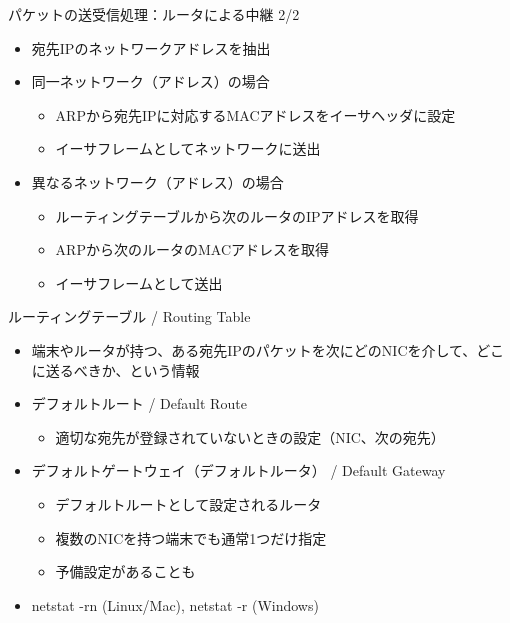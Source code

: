 \documentclass[12pt,aspectratio=169]{beamer}
\begin{document}
\begin{frame}{パケットの送受信処理：ルータによる中継 2/2}

  \begin{itemize}
    \item 宛先IPのネットワークアドレスを抽出
    \item 同一ネットワーク（アドレス）の場合
      \begin{itemize}
        \item ARPから宛先IPに対応するMACアドレスをイーサヘッダに設定
        \item イーサフレームとしてネットワークに送出
      \end{itemize}
    \item 異なるネットワーク（アドレス）の場合
      \begin{itemize}
        \item ルーティングテーブルから次のルータのIPアドレスを取得
        \item ARPから次のルータのMACアドレスを取得
        \item イーサフレームとして送出
      \end{itemize}
  \end{itemize}

\end{frame}

\begin{frame}{ルーティングテーブル / Routing Table}

  \begin{itemize}
    \item 端末やルータが持つ、ある宛先IPのパケットを次にどのNICを介して、どこに送るべきか、という情報
    \item デフォルトルート / Default Route
      \begin{itemize}
        \item 適切な宛先が登録されていないときの設定（NIC、次の宛先）
      \end{itemize}
    \item デフォルトゲートウェイ（デフォルトルータ） / Default Gateway
      \begin{itemize}
        \item デフォルトルートとして設定されるルータ
        \item 複数のNICを持つ端末でも通常1つだけ指定
        \item 予備設定があることも
      \end{itemize}
    \item netstat -rn (Linux/Mac), netstat -r (Windows)

  \end{itemize}

\end{frame}
\end{document}
